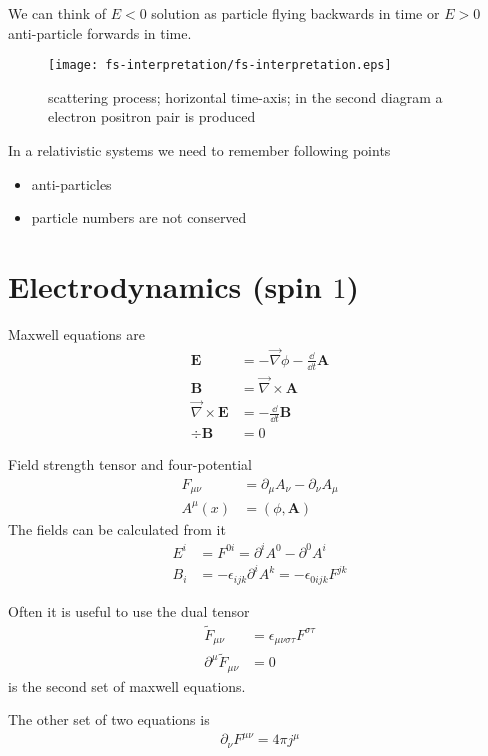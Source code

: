 We can think of $E<0$ solution as particle flying backwards in time or $E > 0$ anti-particle forwards in time.
\begin{figure}[ht]
   \centering
   \texttt{[image: fs-interpretation/fs-interpretation.eps]}
   \caption{scattering process; horizontal time-axis; in the second diagram a electron positron pair is produced}%
   \label{fig:}
\end{figure}

In a relativistic systems we need to remember following points
\begin{itemize}
   \item anti-particles
   \item particle numbers are not conserved
\end{itemize}

\section{Electrodynamics (spin $1$)}
Maxwell equations are
\begin{align}
   \pmb{E} &= -\vec{\nabla} \phi - \frac{\dd}{\dd{t}}{\pmb{A}} \\
   \pmb{B} &= \vec{\nabla} \times \pmb{A}\\
   \vec{\nabla} \times \pmb{E} &= -\frac{\dd}{\dd{t}}{\pmb{B}} \\
   \div \pmb{B} &= 0
\end{align}

Field strength tensor and four-potential
\begin{align}
   F_{\mu\nu} &= \partial_\mu A_\nu - \partial_\nu A_\mu \\
   A^\mu(x) &= (\phi, \pmb{A})
\end{align}
The fields can be calculated from it
\begin{align}
   E^i &= F^{0i} = \partial^i A^0 - \partial ^0 A^i \\
   B_i &= -\epsilon_{ijk} \partial^i A^k = -\epsilon_{0ijk}F^{jk}
\end{align}

Often it is useful to use the dual tensor
\begin{align}
   \tilde{F}_{\mu\nu} &= \epsilon_{\mu\nu\sigma\tau} F^{\sigma \tau} \\
   \partial^{\mu} \tilde{F}_{\mu\nu} &= 0
\end{align}
is the second set of maxwell equations.

The other set of two equations is 
\begin{align}
   \partial_\nu F^{\mu\nu} = 4\pi j^\mu
\end{align}

